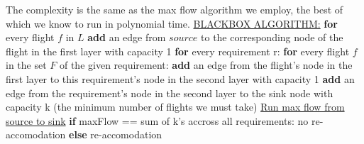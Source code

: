 \documentclass[letterpaper, 11pt]{article}
\begin{document}
The complexity is the same as the max flow algorithm we employ, the best of which we know to run in polynomial time.
\newline
\newline \underline{BLACKBOX ALGORITHM:}
\newline \textbf{for} every flight $f$ in $L$
\newline \indent \textbf{add} an edge from $source$ to the corresponding node of the flight in the first \indent\indent layer with capacity 1
\newline \textbf{for} every requirement r:
\newline \indent \textbf{for} every flight $f$ in the set $F$ of the given requirement:
\newline \indent \indent \textbf{add} an edge from the flight's node in the first layer to this requirement's \indent \indent \indent node in the second layer with capacity 1
\newline \indent \textbf{add} an edge from the requirement's node in the second layer to the sink node \indent \indent with capacity k (the minimum number of flights we must take)
\newline
\newline
\underline{Run max flow from source to sink}
\newline \textbf{if} maxFlow == sum of k's accross all requirements:
\newline \indent no re-accomodation
\newline \textbf{else} re-accomodation



\newpage
\end{document}
